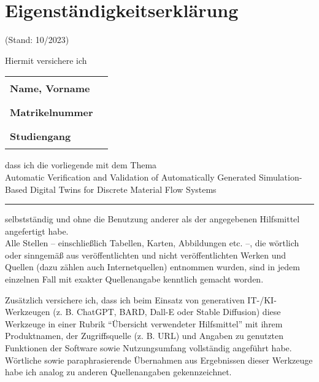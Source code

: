 \chapter*{Eigenständigkeitserklärung}
\thispagestyle{plain}

\begin{center}
  \normalsize (Stand: 10/2023)
\end{center}

\vspace{1.5em}

Hiermit versichere ich

\vspace{1em}

\noindent
\begin{tabular}{ll}
  \textbf{Name, Vorname}  & \rule{8cm}{0.4pt} \\
  \textbf{Matrikelnummer} & \rule{8cm}{0.4pt} \\
  \textbf{Studiengang}    & \rule{8cm}{0.4pt}
\end{tabular}

\vspace{1.5em}

\noindent
dass ich die vorliegende mit dem Thema \\

Automatic Verification and Validation of Automatically Generated Simulation-Based Digital Twins for Discrete Material Flow Systems
\vspace{1em}
\rule{\textwidth}{0.4pt}

\vspace{1.5em}

\noindent
selbstständig und ohne die Benutzung anderer als der angegebenen Hilfsmittel angefertigt habe. \\
Alle Stellen – einschließlich Tabellen, Karten, Abbildungen etc. –, die wörtlich oder sinngemäß aus veröffentlichten und nicht veröffentlichten Werken und Quellen (dazu zählen auch Internetquellen) entnommen wurden, sind in jedem einzelnen Fall mit exakter Quellenangabe kenntlich gemacht worden. \\

\vspace{1.5em}

\noindent
Zusätzlich versichere ich, dass ich beim Einsatz von generativen IT-/KI-Werkzeugen (z. B. ChatGPT, BARD, Dall-E oder Stable Diffusion) diese Werkzeuge in einer Rubrik \enquote{Übersicht verwendeter Hilfsmittel} mit ihrem Produktnamen, der Zugriffsquelle (z. B. URL) und Angaben zu genutzten Funktionen der Software sowie Nutzungsumfang vollständig angeführt habe. Wörtliche sowie paraphrasierende Übernahmen aus Ergebnissen dieser Werkzeuge habe ich analog zu anderen Quellenangaben gekennzeichnet. \\

